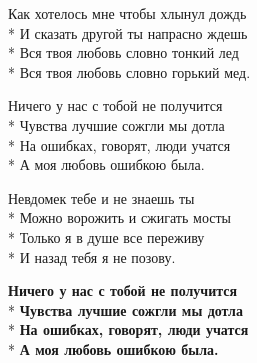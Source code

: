 \medskip

\begin{minipage}{\linewidth}
Как хотелось мне чтобы хлынул дождь\\*
И сказать другой ты напрасно ждешь\\*
Вся твоя любовь словно тонкий лед\\*
Вся твоя любовь словно горький мед.\\
\end{minipage}\par\medskip\nobreak

\medskip

\begin{minipage}{\linewidth}
\hspace*{1.5em}Ничего у нас с тобой не получится\\*
\hspace*{1.5em}Чувства лучшие сожгли мы дотла\\*
\hspace*{1.5em}На ошибках, говорят, люди учатся\\*
\hspace*{1.5em}А моя любовь ошибкою была.\\
\end{minipage}\par\medskip\nobreak

\medskip

\begin{minipage}{\linewidth}
Невдомек тебе и не знаешь ты\\*
Можно ворожить и сжигать мосты\\*
Только я в душе все переживу\\*
И назад тебя я не позову.\\
\end{minipage}\par\medskip\nobreak

\medskip

\begin{minipage}{\linewidth}
\hspace*{1.5em}\textbf{Ничего у нас с тобой не получится}\\*
\hspace*{1.5em}\textbf{Чувства лучшие сожгли мы дотла}\\*
\hspace*{1.5em}\textbf{На ошибках, говорят, люди учатся}\\*
\hspace*{1.5em}\textbf{А моя любовь ошибкою была.}\\
\end{minipage}

